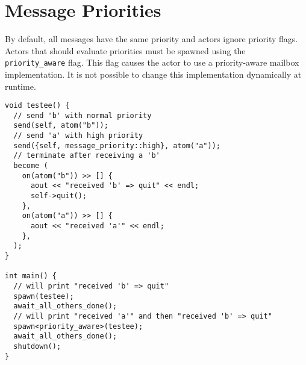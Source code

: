 \section{Message Priorities}

By default, all messages have the same priority and actors ignore priority flags.
Actors that should evaluate priorities must be spawned using the \lstinline^priority_aware^ flag.
This flag causes the actor to use a priority-aware mailbox implementation.
It is not possible to change this implementation dynamically at runtime.

\begin{lstlisting}
void testee() {
  // send 'b' with normal priority
  send(self, atom("b"));
  // send 'a' with high priority
  send({self, message_priority::high}, atom("a"));
  // terminate after receiving a 'b'
  become (
    on(atom("b")) >> [] {
      aout << "received 'b' => quit" << endl;
      self->quit();
    },
    on(atom("a")) >> [] {
      aout << "received 'a'" << endl;
    },
  );
}

int main() {
  // will print "received 'b' => quit"
  spawn(testee);
  await_all_others_done();
  // will print "received 'a'" and then "received 'b' => quit"
  spawn<priority_aware>(testee);
  await_all_others_done();
  shutdown();
}
\end{lstlisting}
